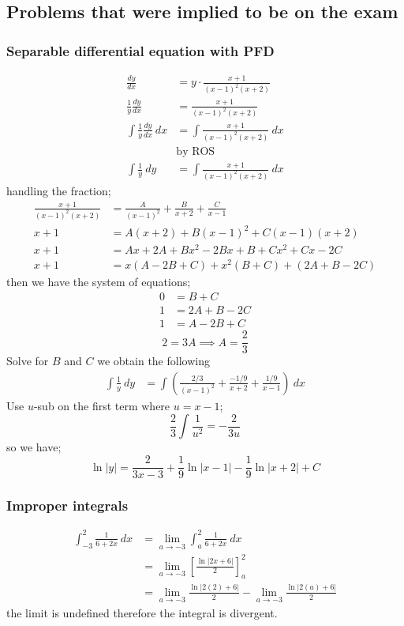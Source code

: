 \documentclass{article}
\begin{document}
\subsection*{Problems that were implied to be on the exam}
\begin{multicols}{2}
\subsubsection*{Separable differential equation with PFD}
\begin{align*}
	\frac{dy}{dx} &= y \cdot \frac{x+1}{(x-1)^2(x+2)} \\
	\frac{1}{y} \frac{dy}{dx} &= \frac{x+1}{(x-1)^2(x+2)} \\
	\int \frac{1}{y} \frac{dy}{dx}\ dx &= \int \frac{x+1}{(x-1)^2(x+2)}\ dx \\
	& \text{by ROS} \\
	\int \frac{1}{y}\ dy &= \int \frac{x+1}{(x-1)^2(x+2)}\ dx
\end{align*}
handling the fraction;
\begin{align*}
\frac{x+1}{(x-1)^2(x+2)} &= \frac{A}{(x-1)^2} + \frac{B}{x+2} + \frac{C}{x-1} \\
	x + 1 &= A(x+2) + B(x-1)^2 + C(x-1)(x+2) \\
	x + 1 &= Ax + 2A + Bx^2 -2Bx + B + Cx^2 + Cx -2C \\
	x + 1 &= x(A-2B+C) + x^2(B+C) + (2A + B - 2C)
\end{align*}
then we have the system of equations;
\begin{align*}
	0 &= B+C \\
	1 &= 2A + B-2C \\
	1 &= A - 2B + C
\end{align*}
\[
	2 = 3A \implies A = \frac{2}{3}
\]
Solve for $B$ and $C$ we obtain the following
\begin{align*}
	\int \frac{1}{y}\ dy &= \int \left( \frac{2/3}{(x-1)^2} + \frac{-1/9}{x+2} + \frac{1/9}{x-1} \right)\ dx
\end{align*}
Use $u$-sub on the first term where $u = x-1$;
\[
	\frac{2}{3} \int \frac{1}{u^2} = -\frac{2}{3u}
\]
so we have;
\[
	\ln|y| = \frac{2}{3x-3} + \frac{1}{9}\ln|x-1| -\frac{1}{9}\ln|x+2| + C
\]

\subsubsection*{Improper integrals}
\begin{align*}
	\int_{-3}^2 \frac{1}{6+2x}\ dx &= \lim_{a \to -3} \int_a^2 \frac{1}{6+2x}\ dx \\
				       &= \lim_{a \to -3} \left[ \frac{\ln|2x+6|}{2} \right]_a^2 \\
				       &= \lim_{a \to -3} \frac{\ln|2(2)+6|}{2} - \lim_{a \to -3} \frac{\ln|2(a)+6|}{2}
\end{align*}
the limit is undefined therefore the integral is divergent.


\end{multicols}
\end{document}
